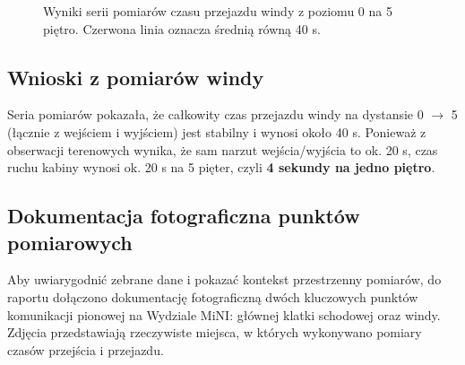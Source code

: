 \documentclass[14pt,a4paper]{extarticle}
\begin{document}
\begin{figure}[H]
    \centering
    \caption{Wyniki serii pomiarów czasu przejazdu windy z poziomu 0 na 5 piętro. Czerwona linia oznacza średnią równą 40 s.}
    \label{fig:pomiary-windy-0-5}
\end{figure}

\subsection{Wnioski z pomiarów windy}
Seria pomiarów pokazała, że całkowity czas przejazdu windy na dystansie 0 $\rightarrow$ 5 (łącznie z wejściem i wyjściem) jest stabilny i wynosi około 40 s. Ponieważ z obserwacji terenowych wynika, że sam narzut wejścia/wyjścia to ok. 20 s, czas ruchu kabiny wynosi ok. 20 s na 5 pięter, czyli \textbf{4 sekundy na jedno piętro}.

\subsection{Dokumentacja fotograficzna punktów pomiarowych}
Aby uwiarygodnić zebrane dane i pokazać kontekst przestrzenny pomiarów, do raportu dołączono dokumentację fotograficzną dwóch kluczowych punktów komunikacji pionowej na Wydziale MiNI: głównej klatki schodowej oraz windy. Zdjęcia przedstawiają rzeczywiste miejsca, w których wykonywano pomiary czasów przejścia i przejazdu.
\end{document}
